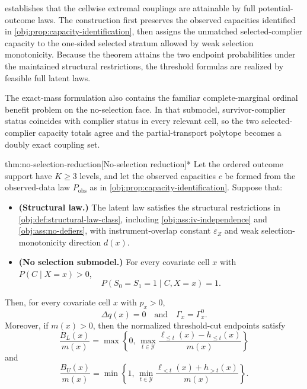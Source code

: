  establishes that the cellwise extremal couplings are attainable by full potential-outcome laws. The construction first preserves the observed capacities identified in \cref{obj:prop:capacity-identification}, then assigns the unmatched selected-complier capacity to the one-sided selected stratum allowed by weak selection monotonicity. Because the theorem attains the two endpoint probabilities under the maintained structural restrictions, the threshold formulas are realized by feasible full latent laws.

The exact-mass formulation also contains the familiar complete-marginal ordinal benefit problem on the no-selection face. In that submodel, survivor-complier status coincides with complier status in every relevant cell, so the two selected-complier capacity totals agree and the partial-transport polytope becomes a doubly exact coupling set.

\begin{theoremv}{thm:no-selection-reduction}[No-selection reduction]*
Let the ordered outcome support have \(K\ge 3\) levels, and let the observed capacities \(c\) be formed from the observed-data law \(P_{\mathrm{obs}}\) as in \cref{obj:prop:capacity-identification}. Suppose that:
\begin{itemize}
\item \textbf{(Structural law.)} The latent law satisfies the structural restrictions in \cref{obj:def:structural-law-class}, including \cref{obj:ass:iv-independence} and \cref{obj:ass:no-defiers}, with instrument-overlap constant \(\varepsilon_Z\) and weak selection-monotonicity direction \(d(x)\).
\item \textbf{(No selection submodel.)} For every covariate cell \(x\) with \(P(C\mid X=x)>0\),
\[
P(S_0=S_1=1\mid C,X=x)=1 .
\]
\end{itemize}
Then, for every covariate cell \(x\) with \(p_x>0\),
\[
\Delta q(x)=0
\quad\text{and}\quad
\Gamma_x=\Gamma_x^{0}.
\]
Moreover, if \(m(x)>0\), then the normalized threshold-cut endpoints satisfy
\[
\frac{B_L(x)}{m(x)}
=
\max\left\{
0,\,
\max_{t\in\mathcal Y}
\frac{\ell_{\le t}(x)-h_{\le t}(x)}{m(x)}
\right\}
\]
and
\[
\frac{B_U(x)}{m(x)}
=
\min\left\{
1,\,
\min_{t\in\mathcal Y}
\frac{\ell_{<t}(x)+h_{>t}(x)}{m(x)}
\right\} .
\]
\end{theoremv}

